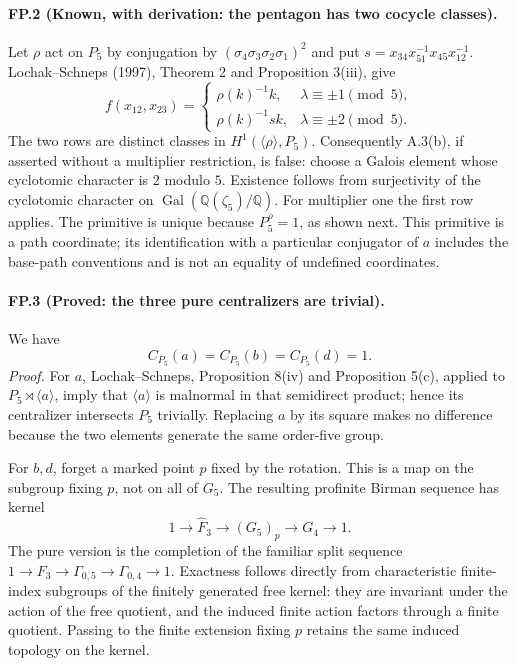 \paragraph{FP.2 (Known, with derivation: the pentagon has two cocycle classes).}
Let $\rho$ act on $P_5$ by conjugation by
$(\sigma_4\sigma_3\sigma_2\sigma_1)^2$ and put
$s=x_{34}x_{51}^{-1}x_{45}x_{12}^{-1}$. Lochak--Schneps (1997),
Theorem 2 and Proposition 3(iii), give
\[
 f(x_{12},x_{23})=
 \begin{cases}
 \rho(k)^{-1}k,&\lambda\equiv\pm1\pmod5,\\
 \rho(k)^{-1}s k,&\lambda\equiv\pm2\pmod5.
 \end{cases}
\]
The two rows are distinct classes in $H^1(\langle\rho\rangle,P_5)$.
Consequently A.3(b), if asserted without a multiplier restriction, is false:
choose a Galois element whose cyclotomic character is $2$ modulo $5$.
Existence follows from surjectivity of the cyclotomic character on
$\operatorname{Gal}(\mathbb Q(\zeta_5)/\mathbb Q)$.
For multiplier one the first row applies. The primitive is unique because
$P_5^{\rho}=1$, as shown next. This primitive is a path coordinate; its
identification with a particular conjugator of $a$ includes the base-path
conventions and is not an equality of undefined coordinates.

\paragraph{FP.3 (Proved: the three pure centralizers are trivial).}
We have
\[
 C_{P_5}(a)=C_{P_5}(b)=C_{P_5}(d)=1.
\]
\emph{Proof.} For $a$, Lochak--Schneps, Proposition 8(iv) and
Proposition 5(c), applied to $P_5\rtimes\langle a\rangle$, imply that
$\langle a\rangle$ is malnormal in that semidirect product; hence its
centralizer intersects $P_5$ trivially. Replacing $a$ by its square makes no
difference because the two elements generate the same order-five group.

For $b,d$, forget a marked point $p$ fixed by the rotation. This is a map
on the subgroup fixing $p$, not on all of $G_5$. The resulting profinite
Birman sequence has kernel
\[
 1\longrightarrow\widehat F_3\longrightarrow
 (G_5)_p\longrightarrow G_4\longrightarrow1.
\]
The pure version is the completion of the familiar split sequence
$1\to F_3\to\Gamma_{0,5}\to\Gamma_{0,4}\to1$.
Exactness follows directly from characteristic finite-index subgroups of the
finitely generated free kernel: they are invariant under the action of the
free quotient, and the induced finite action factors through a finite
quotient. Passing to the finite extension fixing $p$ retains the same
induced topology on the kernel.

